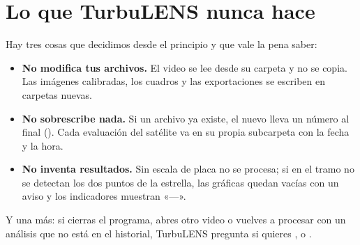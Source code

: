 \section{Lo que TurbuLENS nunca hace}

Hay tres cosas que decidimos desde el principio y que vale la pena saber:
\begin{itemize}
\item \textbf{No modifica tus archivos.} El video se lee desde su carpeta y no se copia. Las imágenes calibradas, los
cuadros y las exportaciones se escriben en carpetas nuevas.
\item \textbf{No sobrescribe nada.} Si un archivo ya existe, el nuevo lleva un número al final
(). Cada evaluación del satélite va en su propia subcarpeta con la fecha y la hora.
\item \textbf{No inventa resultados.} Sin escala de placa no se procesa; si en el tramo no se detectan los dos puntos
de la estrella, las gráficas quedan vacías con un aviso y los indicadores muestran «—».
\end{itemize}
Y una más: si cierras el programa, abres otro video o vuelves a procesar con un análisis que no está en el historial,
TurbuLENS pregunta si quieres ,  o .
